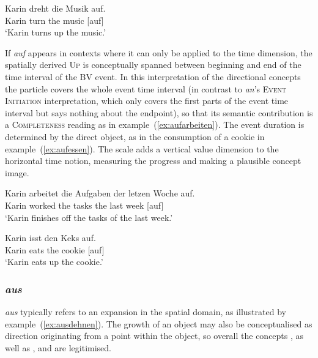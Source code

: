 \documentclass[output=paper]{langsci/langscibook}
\begin{document}
\ea\label{ex:aufdrehen}
\gll Karin dreht die Musik auf.\\
Karin turn the music [auf]\\
\glt `Karin turns up the music.'
\z

If \textit{auf} appears in contexts where it can only be applied to
the time dimension, the spatially derived \textsc{Up} is conceptually
spanned between beginning and end of the time interval of the BV
event. In this interpretation of the directional concepts the particle
covers the whole event time interval (in contrast to \textit{an}'s
\textsc{Event Initiation} interpretation, which only covers the first
parts of the event time interval but says nothing about the endpoint),
so that its semantic contribution is a \textsc{Completeness} reading
as in example~(\ref{ex:aufarbeiten}). The event duration is determined
by the direct object, as in the consumption of a cookie in
example~(\ref{ex:aufessen}). The scale adds a vertical value dimension
to the horizontal time notion, measuring the progress and making
 a plausible concept image.

\ea\label{ex:aufarbeiten}
\gll Karin arbeitet die Aufgaben der letzen Woche auf.\\
Karin worked the tasks the last week [auf]\\
\glt `Karin finishes off the tasks of the last week.'
\z

\ea\label{ex:aufessen}
\gll Karin isst den Keks auf.\\
Karin eats the cookie [auf]\\
\glt `Karin eats up the cookie.'
\z


\vspace{+1mm}
\subsubsection{\textit{aus}}

\textit{aus} typically refers to an expansion in the spatial domain,
as illustrated by example~(\ref{ex:ausdehnen}). The growth of an
object may also be conceptualised as direction originating from a
point within the object, so overall the concepts ,
 as well as ,
 and  are legitimised.
\end{document}
